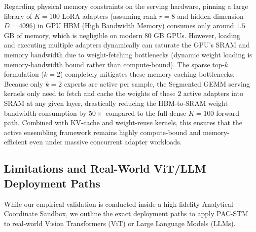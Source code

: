 Regarding physical memory constraints on the serving hardware, pinning a large library of $K=100$ LoRA adapters (assuming rank $r=8$ and hidden dimension $D=4096$) in GPU HBM (High Bandwidth Memory) consumes only around $1.5$ GB of memory, which is negligible on modern $80$ GB GPUs. However, loading and executing multiple adapters dynamically can saturate the GPU's SRAM and memory bandwidth due to weight-fetching bottlenecks (dynamic weight loading is memory-bandwidth bound rather than compute-bound). The sparse top-$k$ formulation ($k=2$) completely mitigates these memory caching bottlenecks. Because only $k=2$ experts are active per sample, the Segmented GEMM serving kernels only need to fetch and cache the weights of these $2$ active adapters into SRAM at any given layer, drastically reducing the HBM-to-SRAM weight bandwidth consumption by $50\times$ compared to the full dense $K=100$ forward path. Combined with KV-cache and weight-reuse kernels, this ensures that the active ensembling framework remains highly compute-bound and memory-efficient even under massive concurrent adapter workloads.

\subsection{Limitations and Real-World ViT/LLM Deployment Paths}
\label{subsec:limitations_deployment}
While our empirical validation is conducted inside a high-fidelity Analytical Coordinate Sandbox, we outline the exact deployment paths to apply PAC-STM to real-world Vision Transformers (ViT) or Large Language Models (LLMs).

